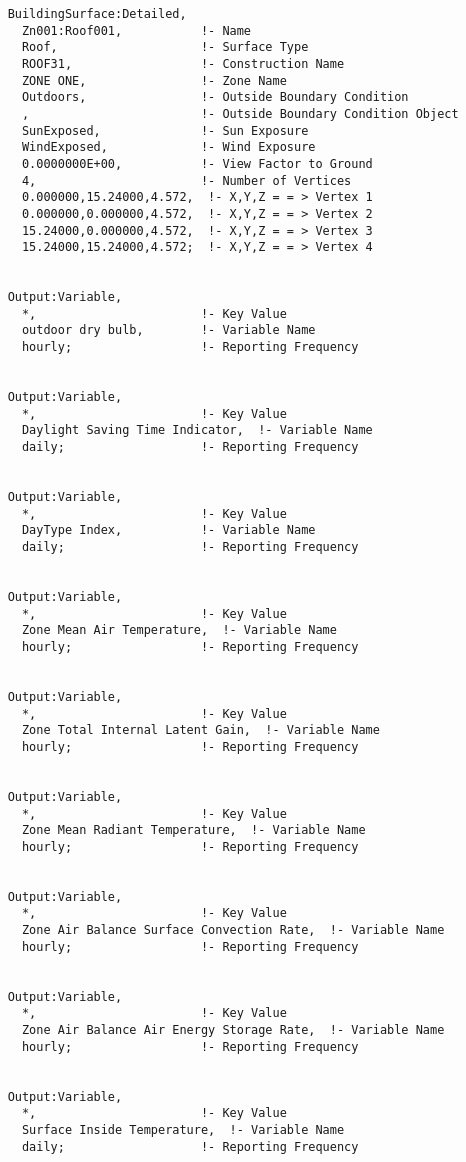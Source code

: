 \begin{lstlisting}
    BuildingSurface:Detailed,
      Zn001:Roof001,           !- Name
      Roof,                    !- Surface Type
      ROOF31,                  !- Construction Name
      ZONE ONE,                !- Zone Name
      Outdoors,                !- Outside Boundary Condition
      ,                        !- Outside Boundary Condition Object
      SunExposed,              !- Sun Exposure
      WindExposed,             !- Wind Exposure
      0.0000000E+00,           !- View Factor to Ground
      4,                       !- Number of Vertices
      0.000000,15.24000,4.572,  !- X,Y,Z = = > Vertex 1
      0.000000,0.000000,4.572,  !- X,Y,Z = = > Vertex 2
      15.24000,0.000000,4.572,  !- X,Y,Z = = > Vertex 3
      15.24000,15.24000,4.572;  !- X,Y,Z = = > Vertex 4


    Output:Variable,
      *,                       !- Key Value
      outdoor dry bulb,        !- Variable Name
      hourly;                  !- Reporting Frequency


    Output:Variable,
      *,                       !- Key Value
      Daylight Saving Time Indicator,  !- Variable Name
      daily;                   !- Reporting Frequency


    Output:Variable,
      *,                       !- Key Value
      DayType Index,           !- Variable Name
      daily;                   !- Reporting Frequency


    Output:Variable,
      *,                       !- Key Value
      Zone Mean Air Temperature,  !- Variable Name
      hourly;                  !- Reporting Frequency


    Output:Variable,
      *,                       !- Key Value
      Zone Total Internal Latent Gain,  !- Variable Name
      hourly;                  !- Reporting Frequency


    Output:Variable,
      *,                       !- Key Value
      Zone Mean Radiant Temperature,  !- Variable Name
      hourly;                  !- Reporting Frequency


    Output:Variable,
      *,                       !- Key Value
      Zone Air Balance Surface Convection Rate,  !- Variable Name
      hourly;                  !- Reporting Frequency


    Output:Variable,
      *,                       !- Key Value
      Zone Air Balance Air Energy Storage Rate,  !- Variable Name
      hourly;                  !- Reporting Frequency


    Output:Variable,
      *,                       !- Key Value
      Surface Inside Temperature,  !- Variable Name
      daily;                   !- Reporting Frequency



\end{lstlisting}
